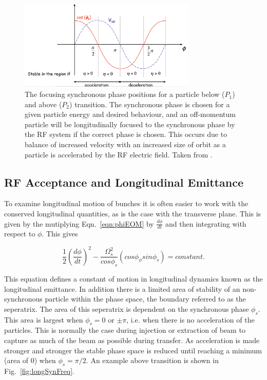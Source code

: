 \begin{figure}
\begin{center}
\includegraphics[width=0.75\textwidth]{appendices/figures/longStab.png}
\end{center}
\caption{The focusing synchronous phase positions for a particle below ($P_{1}$) and above ($P_{2}$) transition. The synchronous phase is chosen for a given particle energy and desired behaviour, and an off-momentum particle will be longitudinally focused to the synchronous phase by the RF system if the correct phase is chosen. This occurs due to balance of increased velocity with an increased size of orbit as a particle is accelerated by the RF electric field. Taken from \cite{Tecker:LongDyn}.}
\label{fig:longPhase}
\end{figure}

\subsection{RF Acceptance and Longitudinal Emittance}

To examine longitudinal motion of bunches it is often easier to work with the conserved longitudinal quantities, as is the case with the transverse plane. This is given by the mutiplying Eqn.~\ref{eqn:phiEOM} by $\frac{d\phi}{dt}$ and then integrating with respect to $\phi$. This gives

\begin{equation}
\frac{1}{2}\left( \frac{d\phi}{dt} \right)^{2} - \frac{\Omega_{s}^{2}}{cos\phi_{s}} \left( cos\phi _ \phi sin\phi_{s} \right) = constant.
\end{equation} 

This equation defines a constant of motion in longitudinal dynamics known as the longitudinal emittance. In addition there is a limited area of stability of an non-synchronous particle within the phase space, the boundary referred to as the seperatrix. The area of this seperatrix is dependent on the synchronous phase $\phi_{s}$. This area is largest when $\phi_{s}=0$ or $\pm \pi$, i.e. when there is no acceleration of the particles. This is normally the case during injection or extraction of beam to capture as much of the beam as possible during transfer. As acceleration is made stronger and stronger the stable phase space is reduced until reaching a minimum (area of $0$) when $\phi_{s}=\pi /2$. An example above transition is shown in Fig.~\ref{fig:longSynFreq}.

